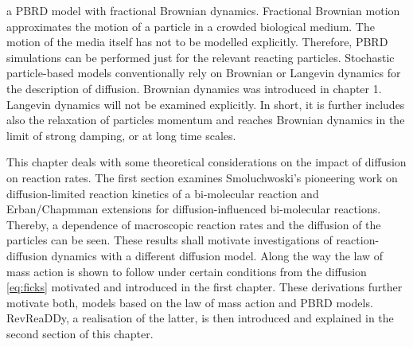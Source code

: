\documentclass[
  a4paper,BCOR10mm,twoside,
  headsepline,footsepline,%
  fleqn,openbib
]{scrbook}
\begin{document}
a PBRD model with fractional Brownian dynamics. Fractional Brownian motion approximates the motion of a particle in a crowded biological medium. The motion of the media itself has not to be modelled explicitly. Therefore, PBRD simulations can be performed just for the relevant reacting particles. Stochastic particle-based models conventionally rely on Brownian or Langevin dynamics for the description of diffusion. Brownian dynamics was introduced in chapter 1. Langevin dynamics will not be examined explicitly. In short, it is further includes also the relaxation of particles momentum and reaches Brownian dynamics in the limit of strong damping, or at long time scales.\par
This chapter deals with some theoretical considerations on the impact of diffusion on reaction rates. The first section examines Smoluchwoski's pioneering work \cite{Smoluchowski1} on diffusion-limited reaction kinetics of a bi-molecular reaction and Erban/Chapmman extensions \cite{Erban2009} for diffusion-influenced bi-molecular reactions. Thereby, a dependence of macroscopic reaction rates and the diffusion of the particles can be seen. These results shall motivate investigations of reaction-diffusion dynamics with a different diffusion model. Along the way the law of mass action is shown to follow under certain conditions from the diffusion \cref{eq:ficks} motivated and introduced in the first chapter. These derivations further motivate both, models based on the law of mass action and PBRD models. RevReaDDy, a realisation of the latter, is then introduced and explained in the second section of this chapter.
\end{document}
